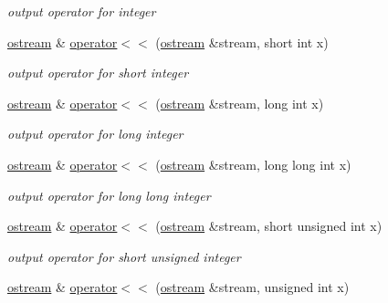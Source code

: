 \begin{DoxyCompactItemize}
\begin{DoxyCompactList}\small\item\em output operator for integer \end{DoxyCompactList}\item 
\hyperlink{classhwlib_1_1ostream}{ostream} \& \hyperlink{classhwlib_1_1ostream_a5f10f89fa98ac5e5f89cc2af0e9b0b6e}{operator$<$$<$} (\hyperlink{classhwlib_1_1ostream}{ostream} \&stream, short int x)\hypertarget{classhwlib_1_1ostream_a5f10f89fa98ac5e5f89cc2af0e9b0b6e}{}\label{classhwlib_1_1ostream_a5f10f89fa98ac5e5f89cc2af0e9b0b6e}

\begin{DoxyCompactList}\small\item\em output operator for short integer \end{DoxyCompactList}\item 
\hyperlink{classhwlib_1_1ostream}{ostream} \& \hyperlink{classhwlib_1_1ostream_af269c1256dc5c755fafc13a7b9125187}{operator$<$$<$} (\hyperlink{classhwlib_1_1ostream}{ostream} \&stream, long int x)\hypertarget{classhwlib_1_1ostream_af269c1256dc5c755fafc13a7b9125187}{}\label{classhwlib_1_1ostream_af269c1256dc5c755fafc13a7b9125187}

\begin{DoxyCompactList}\small\item\em output operator for long integer \end{DoxyCompactList}\item 
\hyperlink{classhwlib_1_1ostream}{ostream} \& \hyperlink{classhwlib_1_1ostream_a25a0b9be93f8f9ed789cef2411acbed2}{operator$<$$<$} (\hyperlink{classhwlib_1_1ostream}{ostream} \&stream, long long int x)\hypertarget{classhwlib_1_1ostream_a25a0b9be93f8f9ed789cef2411acbed2}{}\label{classhwlib_1_1ostream_a25a0b9be93f8f9ed789cef2411acbed2}

\begin{DoxyCompactList}\small\item\em output operator for long long integer \end{DoxyCompactList}\item 
\hyperlink{classhwlib_1_1ostream}{ostream} \& \hyperlink{classhwlib_1_1ostream_a2c5c3586c979f880097499e392bcbf54}{operator$<$$<$} (\hyperlink{classhwlib_1_1ostream}{ostream} \&stream, short unsigned int x)\hypertarget{classhwlib_1_1ostream_a2c5c3586c979f880097499e392bcbf54}{}\label{classhwlib_1_1ostream_a2c5c3586c979f880097499e392bcbf54}

\begin{DoxyCompactList}\small\item\em output operator for short unsigned integer \end{DoxyCompactList}\item 
\hyperlink{classhwlib_1_1ostream}{ostream} \& \hyperlink{classhwlib_1_1ostream_ae70e52926d415af7bfd483c29322f6a1}{operator$<$$<$} (\hyperlink{classhwlib_1_1ostream}{ostream} \&stream, unsigned int x)\hypertarget{classhwlib_1_1ostream_ae70e52926d415af7bfd483c29322f6a1}{}\label{classhwlib_1_1ostream_ae70e52926d415af7bfd483c29322f6a1}


\end{DoxyCompactItemize}
